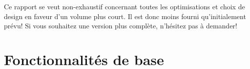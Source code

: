 \documentclass{scrreprt}
\begin{document}
    \begin{info}
        Ce rapport se veut non-exhaustif concernant toutes les optimisations et
        choix de design en faveur d'un volume plus court. Il est donc moins
        fourni qu'initialement prévu! Si vous souhaitez une version plus
        complète, n'hésitez pas à demander!
    \end{info}


    \part{Fonctionnalités de base}








\end{document}
